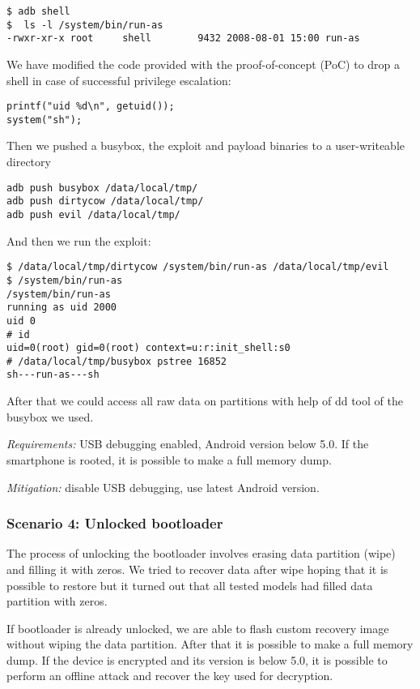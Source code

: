 \begin{lstlisting}
$ adb shell
$  ls -l /system/bin/run-as
-rwxr-xr-x root     shell        9432 2008-08-01 15:00 run-as
\end{lstlisting}

We have modified the code provided with the proof-of-concept (PoC) to drop a shell in case of successful privilege escalation:

\begin{lstlisting}
printf("uid %d\n", getuid());
system("sh");
\end{lstlisting}

Then we pushed a busybox, the exploit and payload binaries to a user-writeable directory

\begin{lstlisting}
adb push busybox /data/local/tmp/
adb push dirtycow /data/local/tmp/
adb push evil /data/local/tmp/
\end{lstlisting}

And then we run the exploit:

\begin{lstlisting}
$ /data/local/tmp/dirtycow /system/bin/run-as /data/local/tmp/evil
$ /system/bin/run-as
/system/bin/run-as
running as uid 2000
uid 0
# id
uid=0(root) gid=0(root) context=u:r:init_shell:s0
# /data/local/tmp/busybox pstree 16852
sh---run-as---sh
\end{lstlisting}

After that we could access all raw data on partitions with help of dd tool of the busybox we used.


\textsl{Requirements:} USB debugging enabled, Android version below 5.0. If the smartphone is rooted, it is possible to make a full memory dump.

\textsl{Mitigation:} disable USB debugging, use latest Android version.

\subsubsection{Scenario 4: Unlocked bootloader}

The process of unlocking the bootloader involves erasing data partition (wipe) and filling it with zeros. We tried to recover data after wipe hoping that it is possible to restore but it turned out that all tested models had filled data partition with zeros.

If bootloader is already unlocked, we are able to flash custom recovery image without wiping the data partition. After that it is possible to make a full memory dump. If the device is encrypted and its version is below 5.0, it is possible to perform an offline attack and recover the key used for decryption.

